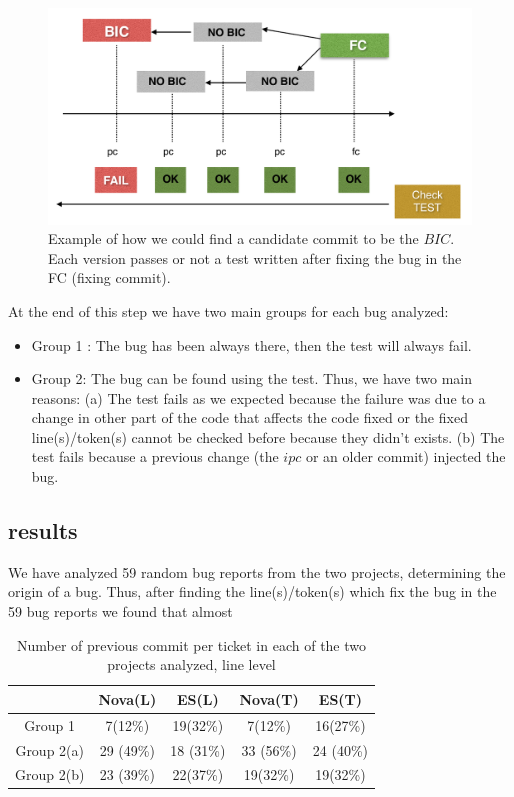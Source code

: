 \documentclass[10pt, conference]{IEEEtran}
\begin{document}
\begin{figure}[ht]
\centering
\includegraphics[width=\columnwidth]{testrecursive.png}
\caption{Example of how we could find a candidate commit to be the $BIC$. Each version passes or not a test written after fixing the bug in the FC (fixing commit).}
\label{fig:test}      
\end{figure}

At the end of this step we have two main groups for each bug analyzed:
\begin{itemize}
	\item Group 1 : The bug has been always there, then the test will always fail.
	\item Group 2: The bug can be found using the test. Thus, we have two main reasons: (a) The test fails as we expected because the failure was due to a change in other part of the code that affects the code fixed or  the fixed line(s)/token(s) cannot be checked before because they didn't exists. (b) The test fails because a previous change (the $ipc$ or an older commit) injected the bug.
\end{itemize}

\subsection{results}

We have analyzed 59 random bug reports from the two projects, determining the origin of a bug. Thus, after finding the line(s)/token(s) which fix the bug in the 59 bug reports we found that almost   

\begin{table}[!t]
\renewcommand{\arraystretch}{1.3}
\caption{Number of previous commit per ticket in each of the two projects analyzed, line level}
\label{tableI}
\centering
\begin{tabular}{|c||c||c|c|c|}
\hline
 & Nova(L) & ES(L)& Nova(T) & ES(T) \\
\hline
Group 1 & 7(12\%) & 19(32\%)& 7(12\%) & 16(27\%)\\
\hline
Group 2(a) & 29 (49\%) & 18 (31\%)& 33 (56\%) & 24 (40\%)\\
\hline
Group 2(b) & 23 (39\%) & 22(37\%)& 19(32\%) & 19(32\%)\\
\hline
\end{tabular}
\end{table}
\end{document}
